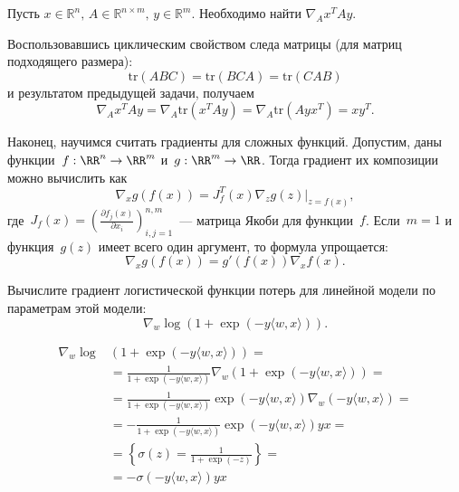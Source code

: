 \documentclass[12pt,fleqn]{article}
\begin{document}
\begin{vkProblem} Пусть $x \in \mathbb{R}^n, \, A \in \mathbb{R}^{n \times m}, \, y \in \mathbb{R}^m.$ Необходимо найти $\nabla_A x^TAy$. 
\end{vkProblem}

\begin{esSolution} Воспользовавшись циклическим свойством следа матрицы (для матриц подходящего размера): 
\[
\text{tr}(ABC) = \text{tr}(BCA) = \text{tr}(CAB)
\]
    и результатом предыдущей задачи, получаем
\[
\nabla_A x^TAy = \nabla_A \text{tr} (x^TAy) =  \nabla_A \text{tr}(Ayx^T) = xy^T.
\]
    
\end{esSolution}

Наконец, научимся считать градиенты для сложных функций.
Допустим, даны функции~$f: \RR^n \to \RR^m$ и~$g: \RR^m \to \RR$.
Тогда градиент их композиции можно вычислить как
\[
    \nabla_x g \left( f(x) \right)
    =
    J_{f}^T (x)
    \nabla_z \left. g(z) \right|_{z = f(x)},
\]
где~$J_f (x) = \left( \frac{\partial f_j(x)}{\partial x_i}  \right)_{i, j = 1}^{n, m}$~--- матрица Якоби для функции~$f$.
Если~$m = 1$ и функция~$g(z)$ имеет всего один аргумент, то формула упрощается:
\[
    \nabla_x g \left( f(x) \right)
    =
    g'(f(x))
    \nabla_x f(x).
\]

\begin{vkProblem}
    Вычислите градиент логистической функции потерь для линейной модели по параметрам этой модели:
    \[
        \nabla_w
        \log \left(
            1
            +
            \exp(-y \langle w, x \rangle)
        \right).
    \]
\end{vkProblem}

\begin{esSolution}
    \begin{align*}
        \nabla_w
        \log &\left(
            1
            +
            \exp(-y \langle w, x \rangle)
        \right)
        = \\
        &=
        \frac{
            1
        }{
            1
            +
            \exp(-y \langle w, x \rangle)
        }
        \nabla_w \left(
            1
            +
            \exp(-y \langle w, x \rangle)
        \right)
        =\\
        &=
        \frac{
            1
        }{
            1
            +
            \exp(-y \langle w, x \rangle)
        }
        \exp(-y \langle w, x \rangle)
        \nabla_w \left(
            -y \langle w, x \rangle
        \right)
        =\\
        &=
        -
        \frac{
            1
        }{
            1
            +
            \exp(-y \langle w, x \rangle)
        }
        \exp(-y \langle w, x \rangle)
        y
        x
        =\\
        &=
        \left\{
            \sigma(z)
            =
            \frac{
                1
            }{
                1 + \exp(-z)
            }
        \right\}
        =\\
        &=
        -
        \sigma(-y \langle w, x \rangle)
        y
        x
    \end{align*}
\end{esSolution}
\end{document}
